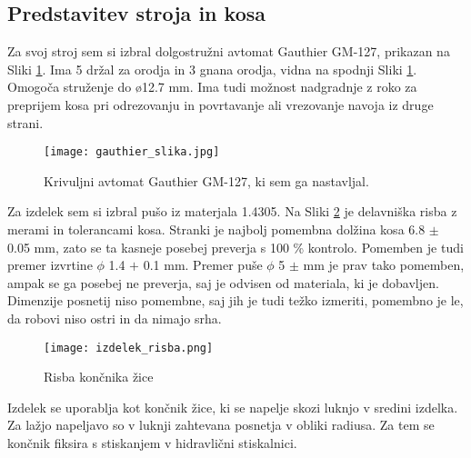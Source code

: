 \subsection{Predstavitev stroja in kosa}
Za svoj stroj sem si izbral dolgostružni avtomat Gauthier GM-127,
prikazan na Sliki \ref{gauthier_priblizano}.
Ima 5 držal za orodja in 3 gnana orodja, vidna na spodnji
Sliki \ref{gauthier_priblizano}. Omogoča struženje do ø12.7 mm.
Ima tudi možnost nadgradnje z roko za preprijem kosa pri odrezovanju in
povrtavanje ali vrezovanje navoja iz druge strani.

\begin{figure}[H]
	\begin{center}
		\texttt{[image: gauthier\_slika.jpg]}
		\caption{Krivuljni avtomat Gauthier GM-127, ki sem ga nastavljal.
			\cite{interna}}
		\label{gauthier_priblizano}
	\end{center}
\end{figure}

Za izdelek sem si izbral pušo iz materjala 1.4305.
Na Sliki \ref{delavniska_risba} je delavniška risba z
merami in tolerancami kosa. Stranki je najbolj pomembna dolžina
kosa 6.8 \(\pm\) 0.05 mm, zato se ta kasneje posebej preverja s
100 \% kontrolo. Pomemben je tudi premer izvrtine \(\phi\) 1.4 \(+\) 0.1 mm.
Premer puše \(\phi\) 5 \(\pm\) mm je prav tako pomemben, ampak se ga
posebej ne preverja, saj je odvisen od materiala, ki je dobavljen.
Dimenzije posnetij niso pomembne, saj jih je tudi težko izmeriti,
pomembno je le, da robovi niso ostri in da nimajo srha.

\begin{figure}[H]
	\begin{center}
		\texttt{[image: izdelek\_risba.png]}
		\caption{Risba končnika žice
			\cite{interna}}
		\label{delavniska_risba}
	\end{center}
\end{figure}

Izdelek se uporablja kot končnik žice, ki se napelje skozi
luknjo v sredini izdelka. Za lažjo napeljavo so v luknji zahtevana
posnetja v obliki radiusa. Za tem se končnik fiksira s
stiskanjem v hidravlični stiskalnici.